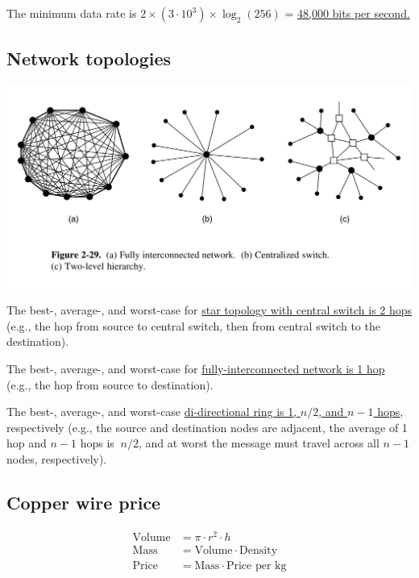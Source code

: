 The minimum data rate is $2 \times (3 \cdot 10^3) \times \log_2(256)$ = \ul{48,000 bits per second.}




\subsection{Network topologies}

\includegraphics[width=\the\columnwidth]{network-topologies.png}

The best-, average-, and worst-case for \ul{star topology with central switch is 2 hops} (e.g., the hop from source to central switch, then from central switch to the destination).

The best-, average-, and worst-case for \ul{fully-interconnected network is 1 hop} (e.g., the hop from source to destination).

The best-, average-, and worst-case \ul{di-directional ring is 1, $n / 2$, and $n - 1$ hops}, respectively (e.g., the source and destination nodes are adjacent, the average of 1 hop and $n - 1$ hops is $~ n/2$, and at worst the message must travel across all $n - 1$ nodes, respectively).

\subsection{Copper wire price}
\begin{align*}
	\text{Volume} &= \pi \cdot r^2 \cdot h \\
	\text{Mass} &= \text{Volume} \cdot \text{Density} \\
	\text{Price} &= \text{Mass} \cdot \text{Price per kg}
\end{align*}

